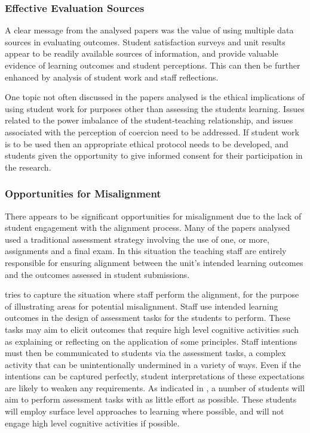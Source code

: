 
\subsubsection{Effective Evaluation Sources} %
\label{ssub:effective_evaluation_sources}

A clear message from the analysed papers was the value of using multiple data sources in evaluating outcomes. Student satisfaction surveys and unit results appear to be readily available sources of information, and provide valuable evidence of learning outcomes and student perceptions. This can then be further enhanced by analysis of student work and staff reflections.

One topic not often discussed in the papers analysed is the ethical implications of using student work for purposes other than assessing the students learning. Issues related to the power imbalance of the student-teaching relationship, and issues associated with the perception of coercion need to be addressed. If student work is to be used then an appropriate ethical protocol needs to be developed, and students given the opportunity to give informed consent for their participation in the research.


\subsubsection{Opportunities for Misalignment} %
\label{ssub:opportinities_for_misalignment}

There appears to be significant opportunities for misalignment due to the lack of student engagement with the alignment process. Many of the papers analysed used a traditional assessment strategy involving the use of one, or more, assignments and a final exam. In this situation the teaching staff are entirely responsible for ensuring alignment between the unit's intended learning outcomes and the outcomes assessed in student submissions. 

 tries to capture the situation where staff perform the alignment, for the purpose of illustrating areas for potential misalignment. Staff use intended learning outcomes in the design of assessment tasks for the students to perform. These tasks may aim to elicit outcomes that require high level cognitive activities such as explaining or reflecting on the application of some principles. Staff intentions must then be communicated to students via the assessment tasks, a complex activity that can be unintentionally undermined in a variety of ways. Even if the intentions can be captured perfectly, student interpretations of these expectations are likely to weaken any requirements. As indicated in , a number of students will aim to perform assessment tasks with as little effort as possible. These students will employ surface level approaches to learning where possible, and will not engage high level cognitive activities if possible. 

